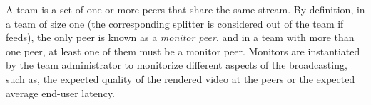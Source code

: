 
\label{sec:team_def}

A team is a set of one or more peers that share the same stream. By
definition, in a team of size one (the corresponding splitter is
considered out of the team if feeds), the only peer is known as a
\emph{monitor peer}, and in a team with more than one peer, at least
one of them must be a monitor peer. Monitors are instantiated by the
team administrator to monitorize different aspects of the
broadcasting, such as, the expected quality of the rendered video at
the peers or the expected average end-user latency.
